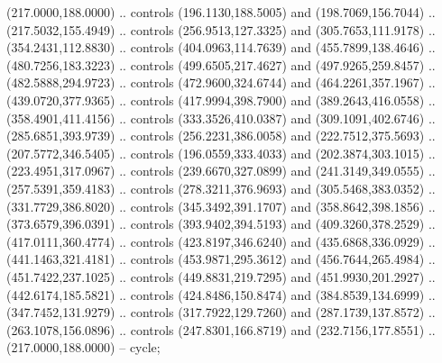 
\begin{scope}[shift={(-1.80372,0)},draw=black,fill=blue!30,line join=round,line width=0.208pt]%
 (217.0000,188.0000) .. controls (196.1130,188.5005) and
  (198.7069,156.7044) .. (217.5032,155.4949) .. controls (256.9513,127.3325) and
  (305.7653,111.9178) .. (354.2431,112.8830) .. controls (404.0963,114.7639) and
  (455.7899,138.4646) .. (480.7256,183.3223) .. controls (499.6505,217.4627) and
  (497.9265,259.8457) .. (482.5888,294.9723) .. controls (472.9600,324.6744) and
  (464.2261,357.1967) .. (439.0720,377.9365) .. controls (417.9994,398.7900) and
  (389.2643,416.0558) .. (358.4901,411.4156) .. controls (333.3526,410.0387) and
  (309.1091,402.6746) .. (285.6851,393.9739) .. controls (256.2231,386.0058) and
  (222.7512,375.5693) .. (207.5772,346.5405) .. controls (196.0559,333.4033) and
  (202.3874,303.1015) .. (223.4951,317.0967) .. controls (239.6670,327.0899) and
  (241.3149,349.0555) .. (257.5391,359.4183) .. controls (278.3211,376.9693) and
  (305.5468,383.0352) .. (331.7729,386.8020) .. controls (345.3492,391.1707) and
  (358.8642,398.1856) .. (373.6579,396.0391) .. controls (393.9402,394.5193) and
  (409.3260,378.2529) .. (417.0111,360.4774) .. controls (423.8197,346.6240) and
  (435.6868,336.0929) .. (441.1463,321.4181) .. controls (453.9871,295.3612) and
  (456.7644,265.4984) .. (451.7422,237.1025) .. controls (449.8831,219.7295) and
  (451.9930,201.2927) .. (442.6174,185.5821) .. controls (424.8486,150.8474) and
  (384.8539,134.6999) .. (347.7452,131.9279) .. controls (317.7922,129.7260) and
  (287.1739,137.8572) .. (263.1078,156.0896) .. controls (247.8301,166.8719) and
  (232.7156,177.8551) .. (217.0000,188.0000) -- cycle;
\end{scope}
